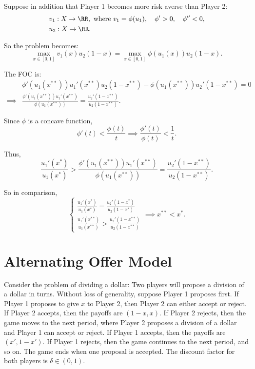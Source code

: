 Suppose in addition that Player 1 becomes more risk averse than Player 2:
\[
\begin{aligned}
  & v_1:X\to \RR, \text{ where }v_1 = \phi(u_1), \quad \phi'>0,\quad \phi''<0,\\
  & u_2:X\to \RR.
\end{aligned}
\]

So the problem becomes:
\[
  \max_{x\in [0,1]} v_1(x)u_2(1-x) = \max_{x\in [0,1]} \phi(u_1(x))u_2(1-x).
\]

The FOC is:
\[
  \begin{aligned}
    & \phi'(u_1(x^{**}))u_1'(x^{**})u_2(1-x^{**}) - \phi(u_1(x^{**}))u_2'(1-x^{**}) = 0\\
    \implies & \frac{\phi'(u_1(x^{**}))u_1'(x^{**})}{\phi(u_1(x^{**}))} = \frac{u_2'(1-x^{**})}{u_2(1-x^{**})}.
  \end{aligned}
\]

Since $\phi$ is a concave function,
\[
\phi'(t)<\frac{\phi(t)}{t}\implies \frac{\phi'(t)}{\phi(t)}<\frac{1}{t}.
\]

Thus, 
\[
\frac{u_1'(x^*)}{u_1(x^*)} > \frac{\phi'(u_1(x^{**}))u_1'(x^{**})}{\phi(u_1(x^{**}))} = \frac{u_2'(1-x^{**})}{u_2(1-x^{**})}.
\]

So in comparison,
\[
\begin{cases}
  \frac{u_1'(x^*)}{u_1(x^*)}  = \frac{u_2'(1-x^*)}{u_2(1-x^*)} \\
  \frac{u_1'(x^{**})}{u_1(x^{**})} > \frac{u_2'(1-x^{**})}{u_2(1-x^{**})}
\end{cases}\implies x^{**} < x^*.
\]

\section{Alternating Offer Model}

Consider the problem of dividing a dollar: Two players will propose a division of a dollar in turns. Without loss of generality, suppose Player 1 proposes first. If Player 1 proposes to give $x$ to Player 2, then Player 2 can either accept or reject. If Player 2 accepts, then the payoffs are $(1-x,x)$. If Player 2 rejects, then the game moves to the next period, where Player 2 proposes a division of a dollar and Player 1 can accept or reject. If Player 1 accepts, then the payoffs are $(x',1-x')$. If Player 1 rejects, then the game continues to the next period, and so on. The game ends when one proposal is accepted. The discount factor for both players is $\delta\in (0,1)$.

